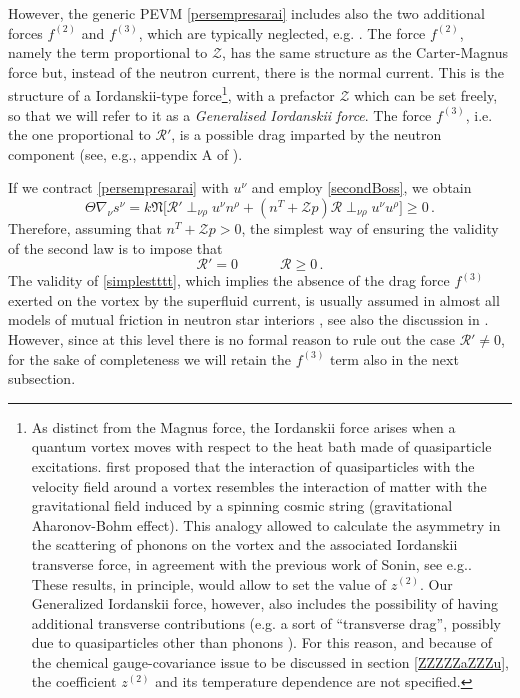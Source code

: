 \documentclass[preprints,article,accept,moreauthors,pdftex]{mdpi}
\newcommand{\spc}{\quad \quad \quad}
\begin{document}
However,  the generic PEVM \eqref{persempresarai} includes also the two additional forces $f^{(2)}$ and $f^{(3)}$, which are typically neglected, e.g.  \cite{langlois98,Andersson_Mutual_Friction_2016,GavassinoGeometria}.
The force $f^{(2)}$, namely the term proportional to $\mathcal{Z}$, has the same structure as the Carter-Magnus force but, instead of the neutron current, there is the normal current. 
This is the structure of a Iordanskii-type force\footnote{
As distinct from the Magnus force, the  Iordanskii force arises when a quantum vortex moves with respect to the heat bath made of quasiparticle excitations.  
\citet{Volovik1998pc} first proposed that  the interaction of quasiparticles with the velocity field around a vortex resembles the interaction of matter with the gravitational field induced by  a spinning cosmic string (gravitational Aharonov-Bohm effect). This analogy  allowed \citet{stone2000} to calculate the asymmetry in the scattering of phonons on the vortex and the associated Iordanskii transverse force, in agreement with the previous work of Sonin, see e.g.\cite{sonin1997PhRvB}. 
These results, in principle, would allow to set the value of $z^{(2)}$.
Our Generalized Iordanskii force, however, also includes the possibility of having additional transverse contributions  (e.g. a sort of ``transverse drag'', possibly due to quasiparticles other than phonons \cite{barenghi1983JLTP,donnelly_book}). For this reason, and because of the chemical gauge-covariance issue to be discussed in section \ref{ZZZZZaZZZu},  the coefficient $z^{(2)}$ and its temperature dependence are not specified. 
}, 
with a prefactor $\mathcal{Z}$ which can be set freely, so that we will refer to it as a \textit{Generalised Iordanskii force}. 
The force $f^{(3)}$, i.e. the one proportional to $\mathcal{R}'$, is a possible drag imparted by the neutron component (see, e.g., appendix A of \cite{antonelli2020MNRAS}).

If we contract \eqref{persempresarai} with $u^\nu$ and employ \eqref{secondBoss}, we obtain
\begin{equation}\label{ssssSsecondddLav}
\Theta \nabla_\nu s^\nu = k\mathfrak{N} \bigg[ \mathcal{R}' {\perp}_{\nu \rho} u^\nu n^\rho +(n^T+\mathcal{Z}p) \mathcal{R} {\perp}_{\nu \rho} u^\nu u^\rho \bigg] \geq 0 \, .
\end{equation}
Therefore, assuming that $n^T+\mathcal{Z}p>0$, the simplest way of ensuring the validity of the second law is to impose that
\begin{equation}\label{simplestttt}
\mathcal{R}'=0  \spc  \mathcal{R} \geq 0 \, .
\end{equation}
The validity of \eqref{simplestttt}, which implies the absence of the drag force $f^{(3)}$ exerted on the vortex by the superfluid current, is usually assumed in almost all models of mutual friction in neutron star interiors \citep{langlois98,chamel_review_crust,haskellsedrakian2017}, see also the discussion in \citep{antonelli2020MNRAS}.
However, since at this level there is no formal reason to rule out the case $\mathcal{R}' \neq 0$, for the sake of completeness we will retain the $f^{(3)}$ term also in the next subsection.
\end{document}
